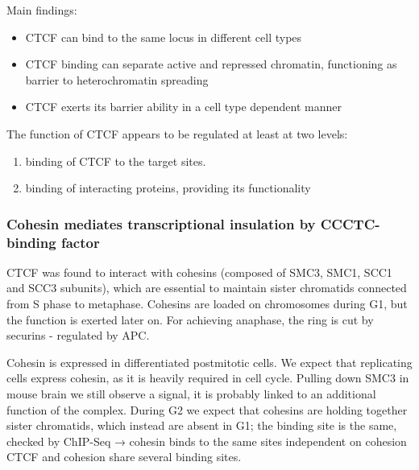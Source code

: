 Main findings:

\begin{itemize}
\tightlist
\item
  CTCF can bind to the same locus in different cell types
\item
  CTCF binding can separate active and repressed chromatin, functioning as barrier to heterochromatin spreading
\item
  CTCF exerts its barrier ability in a cell type dependent manner
\end{itemize}

The function of CTCF appears to be regulated at least at two levels:

\begin{enumerate}
\def\labelenumi{\arabic{enumi}.}
\tightlist
\item
  binding of CTCF to the target sites.
\item
  binding of interacting proteins, providing its functionality
\end{enumerate}

\hypertarget{cohesin-mediates-transcriptional-insulation-by-ccctc-binding-factor}{%
\subsubsection{Cohesin mediates transcriptional insulation by CCCTC-binding factor}\label{cohesin-mediates-transcriptional-insulation-by-ccctc-binding-factor}}

CTCF was found to interact with cohesins (composed of SMC3, SMC1, SCC1 and SCC3 subunits), which are essential to maintain sister chromatids connected from S phase to metaphase. Cohesins are loaded on chromosomes during G1, but the function is exerted later on. For achieving anaphase, the ring is cut by securins - regulated by APC.

Cohesin is expressed in differentiated postmitotic cells. We expect that replicating cells express cohesin, as it is heavily required in cell cycle. Pulling down SMC3 in mouse brain we still observe a signal, it is probably linked to an additional function of the complex. During G2 we expect that cohesins are holding together sister chromatids, which instead are absent in G1; the binding site is the same, checked by ChIP-Seq → cohesin binds to the same sites independent on cohesion CTCF and cohesion share several binding sites.

